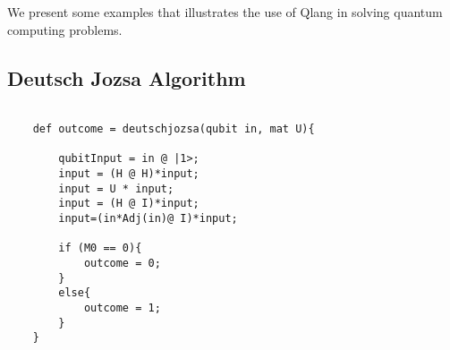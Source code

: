 We present some examples that illustrates the use of Qlang in solving quantum computing problems.

\subsection{Deutsch Jozsa Algorithm}
\begin{lstlisting}

	def outcome = deutschjozsa(qubit in, mat U){
		
		qubitInput = in @ |1>;
		input = (H @ H)*input;
		input = U * input;
		input = (H @ I)*input;
		input=(in*Adj(in)@ I)*input;
		
		if (M0 == 0){
			outcome = 0;
		}
		else{
			outcome = 1;
		}
	}
\end{lstlisting}
